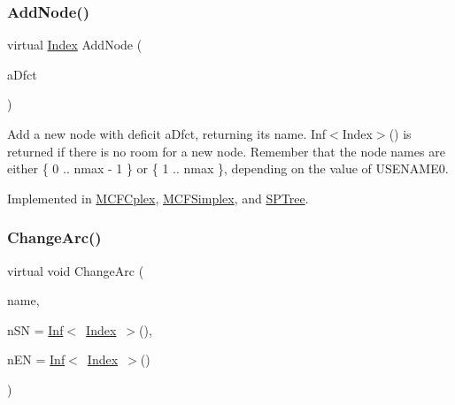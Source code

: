 \mbox{\label{class_m_c_f_class_a6d58679267d8b620cc3337583dab4626}} 
\subsubsection{\texorpdfstring{Add\+Node()}{AddNode()}}
{\footnotesize\ttfamily virtual \mbox{\hyperlink{class_m_c_f_class_ad53d6229d7ec28555a9c9c2fd9abf773}{Index}} Add\+Node (\begin{DoxyParamCaption}\item[{\mbox{\hyperlink{class_m_c_f_class_a11f747fbdff346237c8db4469d569994}{c\+F\+Number}}}]{a\+Dfct }\end{DoxyParamCaption})\hspace{0.3cm}{\ttfamily [pure virtual]}}

Add a new node with deficit a\+Dfct, returning its name. Inf$<$\+Index$>$() is returned if there is no room for a new node. Remember that the node names are either \{ 0 .. nmax -\/ 1 \} or \{ 1 .. nmax \}, depending on the value of U\+S\+E\+N\+A\+M\+E0. 

Implemented in \mbox{\hyperlink{class_m_c_f_cplex_a3b1944c7daf09b4e72cc2eeda39e335d}{M\+C\+F\+Cplex}}, \mbox{\hyperlink{class_m_c_f_simplex_a3b1944c7daf09b4e72cc2eeda39e335d}{M\+C\+F\+Simplex}}, and \mbox{\hyperlink{class_s_p_tree_a3b1944c7daf09b4e72cc2eeda39e335d}{S\+P\+Tree}}.

\mbox{\label{class_m_c_f_class_aef2d28b0b0a2420d6b8b7093d827fa67}} 
\subsubsection{\texorpdfstring{Change\+Arc()}{ChangeArc()}}
{\footnotesize\ttfamily virtual void Change\+Arc (\begin{DoxyParamCaption}\item[{\mbox{\hyperlink{class_m_c_f_class_a76aaabb20535c51a2752b93f6c38fe54}{c\+Index}}}]{name,  }\item[{\mbox{\hyperlink{class_m_c_f_class_a76aaabb20535c51a2752b93f6c38fe54}{c\+Index}}}]{n\+SN = {\ttfamily \mbox{\hyperlink{class_o_p_ttypes__di__unipi__it_1_1_inf}{Inf}}$<$~\mbox{\hyperlink{class_m_c_f_class_ad53d6229d7ec28555a9c9c2fd9abf773}{Index}}~$>$()},  }\item[{\mbox{\hyperlink{class_m_c_f_class_a76aaabb20535c51a2752b93f6c38fe54}{c\+Index}}}]{n\+EN = {\ttfamily \mbox{\hyperlink{class_o_p_ttypes__di__unipi__it_1_1_inf}{Inf}}$<$~\mbox{\hyperlink{class_m_c_f_class_ad53d6229d7ec28555a9c9c2fd9abf773}{Index}}~$>$()} }\end{DoxyParamCaption})\hspace{0.3cm}{\ttfamily [pure virtual]}}

